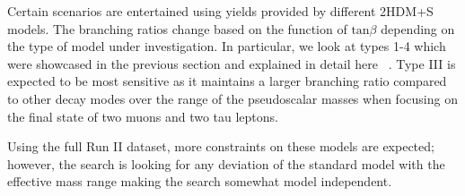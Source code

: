 Certain scenarios are entertained using yields provided by different 2HDM+S models. The branching ratios change based on the function of $\text{tan}\beta$ depending on the type of model under investigation. In particular, we look at types 1-4 which were showcased in the previous section and explained in detail here ~\cite{HExo:2017}. Type III is expected to be most sensitive as it maintains a larger branching ratio compared to other decay modes over the range of the pseudoscalar masses when focusing on the final state of two muons and two tau leptons.

Using the full Run II dataset, more constraints on these models are expected; however, the search is looking for any deviation of the standard model with the effective mass range making the search somewhat model independent. 

